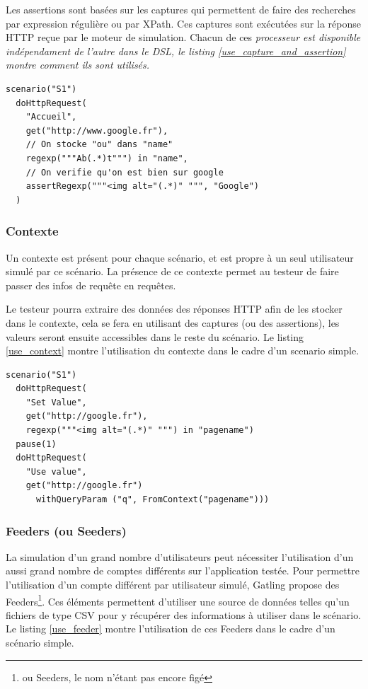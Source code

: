 Les assertions sont basées sur les captures qui permettent de faire des recherches par expression régulière ou par XPath. Ces captures sont exécutées sur la réponse HTTP reçue par le moteur de simulation. Chacun de ces \em{processeur} est disponible indépendament de l'autre dans le DSL, le listing \ref{use_capture_and_assertion} montre comment ils sont utilisés.

\begin{lstlisting}[caption={Utilisation des captures et assertions},label={use_capture_and_assertion}]
scenario("S1")
  doHttpRequest(
    "Accueil",
    get("http://www.google.fr"),
    // On stocke "ou" dans "name"
    regexp("""Ab(.*)t""") in "name",
    // On verifie qu'on est bien sur google
    assertRegexp("""<img alt="(.*)" """, "Google")
  )
\end{lstlisting}

\subsubsection{Contexte}
Un contexte est présent pour chaque scénario, et est propre à un seul utilisateur simulé par ce scénario. La présence de ce contexte permet au testeur de faire passer des infos de requête en requêtes.

Le testeur pourra extraire des données des réponses HTTP afin de les stocker dans le contexte, cela se fera en utilisant des captures (ou des assertions), les valeurs seront ensuite accessibles dans le reste du scénario. Le listing \ref{use_context} montre l'utilisation du contexte dans le cadre d'un scenario simple.

\begin{lstlisting}[caption={Utilisation du contexte},label={use_context}]
scenario("S1")
  doHttpRequest(
    "Set Value",
    get("http://google.fr"),
    regexp("""<img alt="(.*)" """) in "pagename")
  pause(1)
  doHttpRequest(
  	"Use value",
  	get("http://google.fr") 
  	  withQueryParam ("q", FromContext("pagename")))
\end{lstlisting}

\subsubsection{Feeders (ou Seeders)}
La simulation d'un grand nombre d'utilisateurs peut nécessiter l'utilisation d'un aussi grand nombre de comptes différents sur l'application testée. Pour permettre l'utilisation d'un compte différent par utilisateur simulé, Gatling propose des Feeders\footnote{ou Seeders, le nom n'étant pas encore figé}. Ces éléments permettent d'utiliser une source de données telles qu'un fichiers de type CSV pour y récupérer des informations à utiliser dans le scénario. Le listing \ref{use_feeder} montre l'utilisation de ces Feeders dans le cadre d'un scénario simple.

